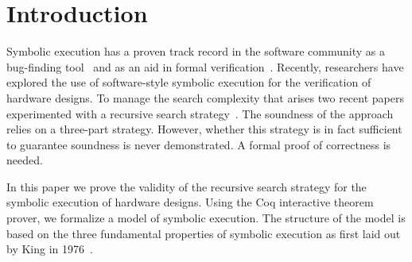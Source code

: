 \section{Introduction}
Symbolic execution has a proven track record in the software community as a
bug-finding tool~\cite{} and as an aid in formal verification~\cite{}. Recently,
researchers have explored the use of software-style symbolic execution for the
verification of hardware designs. To manage the search complexity that arises
two recent papers experimented with a recursive search strategy~\cite{}. The
soundness of the approach relies on a three-part strategy. However, whether this
strategy is in fact sufficient to guarantee soundness is never demonstrated. A
formal proof of correctness is needed.

In this paper we prove the validity of the recursive search strategy for the
symbolic execution of hardware designs. Using the Coq interactive theorem
prover, we formalize a model of symbolic execution. The structure of the model
is based on the three fundamental properties of symbolic execution as first laid
out by King in 1976~\cite{}.


